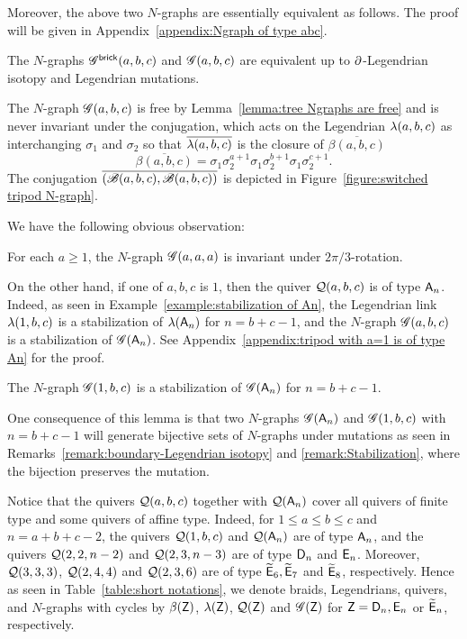 Moreover, the above two $N$-graphs are essentially equivalent as follows.
The proof will be given in Appendix~\ref{appendix:Ngraph of type abc}.
\begin{lemma}
The $N$-graphs $\mathscr{G}^{\mathsf{brick}}(a,b,c)$ and $\mathscr{G}(a,b,c)$ are equivalent up to $\partial$-Legendrian isotopy and Legendrian mutations.
\end{lemma}

The $N$-graph $\mathscr{G}(a,b,c)$ is free by Lemma~\ref{lemma:tree Ngraphs are free} and is never invariant under the conjugation, which acts on the Legendrian $\lambda(a,b,c)$ as interchanging $\sigma_1$ and $\sigma_2$ so that $\overline{\lambda(a,b,c)}$ is the closure of $\overline{\beta(a,b,c)}$
\[
\overline{\beta(a,b,c)} = \sigma_1\sigma_2^{a+1}\sigma_1\sigma_2^{b+1}\sigma_1\sigma_2^{c+1}.
\]
The conjugation $\overline{(\mathscr{B}(a,b,c),\mathscr{B}(a,b,c))}$ is depicted in Figure~\ref{figure:switched tripod N-graph}.

We have the following obvious observation:
\begin{lemma}
For each $a\ge 1$, the $N$-graph $\mathscr{G}(a,a,a)$ is invariant under $2\pi/3$-rotation.
\end{lemma}

On the other hand, if one of $a,b,c$ is $1$, then the quiver $\mathcal{Q}(a,b,c)$ is of type $\mathsf{A}_n$. Indeed, 
as seen in Example~\ref{example:stabilization of An}, the Legendrian link $\lambda(1,b,c)$ is a stabilization of $\lambda(\mathsf{A}_n)$ for $n=b+c-1$, and the $N$-graph $\mathscr{G}(a,b,c)$ is a stabilization of $\mathscr{G}(\mathsf{A}_n)$.
See Appendix~\ref{appendix:tripod with a=1 is of type An} for the proof.
\begin{lemma}\label{lemma:stabilized An}
The $N$-graph $\mathscr{G}(1,b,c)$ is a stabilization of $\mathscr{G}(\mathsf{A}_n)$ for $n=b+c-1$.
\end{lemma}
One consequence of this lemma is that two $N$-graphs $\mathscr{G}(\mathsf{A}_n)$ and $\mathscr{G}(1,b,c)$ with $n=b+c-1$ will generate bijective sets of $N$-graphs under mutations as seen in Remarks~\ref{remark:boundary-Legendrian isotopy} and \ref{remark:Stabilization}, where the bijection preserves the mutation.

Notice that the quivers $\mathcal{Q}(a,b,c)$ together with $\mathcal{Q}(\mathsf{A}_n)$ cover all quivers of finite type and some quivers of affine type. Indeed, for $1\le a\le b\le c$ and $n=a+b+c-2$, the quivers $\mathcal{Q}(1,b,c)$ and $\mathcal{Q}(\mathsf{A}_n)$ are of type $\mathsf{A}_n$, and the quivers $\mathcal{Q}(2,2,n-2)$ and $\mathcal{Q}(2,3,n-3)$ are of type $\mathsf{D}_n$ and $\mathsf{E}_n$.
Moreover, $\mathcal{Q}(3,3,3)$, $\mathcal{Q}(2,4,4)$ and $\mathcal{Q}(2,3,6)$ are of type $\widetilde{\mathsf{E}}_6, \widetilde{\mathsf{E}}_7$ and $\widetilde{\mathsf{E}}_8$, respectively.
Hence as seen in Table~\ref{table:short notations}, we denote braids, Legendrians, quivers, and $N$-graphs with cycles by $\beta(\mathsf{Z})$, $\lambda(\mathsf{Z})$, $\mathcal{Q}(\mathsf{Z})$ and $\mathscr{G}(\mathsf{Z})$ for $\mathsf{Z}=\mathsf{D}_n, \mathsf{E}_n$ or $\widetilde{\mathsf{E}}_n$, respectively.

